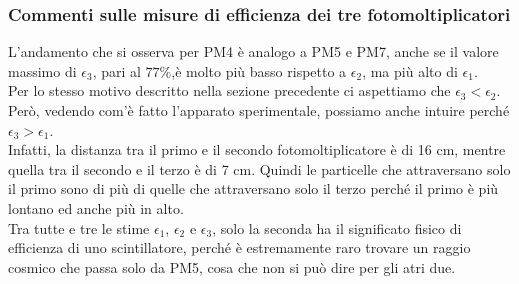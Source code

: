 \documentclass{article}
\begin{document}
\subsubsection{Commenti sulle misure di efficienza dei tre fotomoltiplicatori}
L'andamento che si osserva per PM4 è analogo a PM5 e PM7, anche se il valore massimo di $\epsilon_3$, pari al $77\%$,è molto più basso rispetto a $\epsilon_2$, ma più alto di $\epsilon_1$.\\
Per lo stesso motivo descritto nella sezione precedente ci aspettiamo che $\epsilon_3 < \epsilon_2$. Però, vedendo com'è fatto l'apparato sperimentale, possiamo anche intuire perché $\epsilon_3 > \epsilon_1$. \\
Infatti, la distanza tra il primo e il secondo fotomoltiplicatore è di 16 cm, mentre quella tra il secondo e il terzo è di 7 cm. Quindi le particelle che attraversano solo il primo sono di più di quelle che attraversano solo il terzo perché il primo è più lontano ed anche più in alto. \\
Tra tutte e tre le stime $\epsilon_1$, $\epsilon_2$ e $\epsilon_3$, solo la seconda ha il significato fisico di efficienza di uno scintillatore, perché è estremamente raro trovare un raggio cosmico che passa solo da PM5, cosa che non si può dire per gli atri due.
\end{document}
